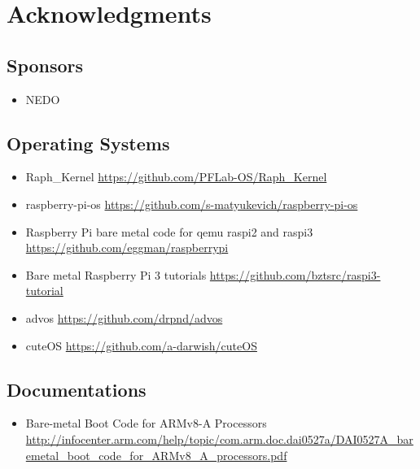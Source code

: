 \section{Acknowledgments}

\subsection{Sponsors}

\begin{itemize}
\item NEDO
\end{itemize}

\subsection{Operating Systems}

\begin{itemize}
\item Raph\_Kernel
  \url{https://github.com/PFLab-OS/Raph_Kernel}
\item raspberry-pi-os
  \url{https://github.com/s-matyukevich/raspberry-pi-os}
\item Raspberry Pi bare metal code for qemu raspi2 and raspi3
  \url{https://github.com/eggman/raspberrypi}
\item Bare metal Raspberry Pi 3 tutorials
  \url{https://github.com/bztsrc/raspi3-tutorial}
\item advos
  \url{https://github.com/drpnd/advos}
\item cuteOS
  \url{https://github.com/a-darwish/cuteOS}
\end{itemize}

\subsection{Documentations}

\begin{itemize}
\item Bare-metal Boot Code for ARMv8-A Processors
  \url{http://infocenter.arm.com/help/topic/com.arm.doc.dai0527a/DAI0527A_baremetal_boot_code_for_ARMv8_A_processors.pdf}
\end{itemize}


